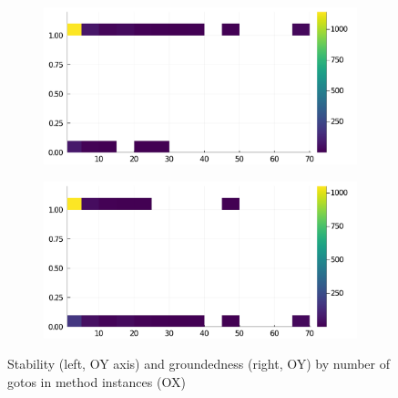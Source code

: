 \begin{figure}[h]
     \begin{subfigure}[b]{0.49\textwidth}
       \includegraphics[width=\textwidth]{figs/all-package-graphs/Genie-gotos-vs-stable.pdf}
     \end{subfigure}
     \begin{subfigure}[b]{0.49\textwidth}
       \includegraphics[width=\textwidth]{figs/all-package-graphs/Genie-gotos-vs-grounded.pdf}
     \end{subfigure}
\caption{Stability (left, OY axis) and groundedness (right, OY) by number of gotos in method instances (OX)}%
%
\label{figs:gotos:Genie}
\end{figure}

